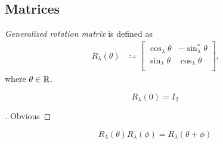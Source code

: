 \documentclass[../main.tex]{subfiles}
\begin{document}
\subsection{Matrices}
\begin{definition}\label{M:Rotation}
\textit{Generalized rotation matrix} is defined as
\begin{align*}
R_\lambda\left(\theta\right)&\coloneqq
\begin{bmatrix}
\cos_\lambda{\theta}&-\sin_\lambda^\ast{\theta}\\
\sin_\lambda{\theta}&\cos_\lambda{\theta}\\
\end{bmatrix}\text{,}
\end{align*}
where $\theta\in\mathbb{R}$.
\end{definition}
\begin{corollary}\label{M:Rotation:Identity}
\begin{equation*}
R_\lambda\left(0\right)
=
I_2
\end{equation*}
\end{corollary}
\begin{proof}[]
Obvious
\end{proof}
\begin{corollary}\label{M:Rotation:Sum}
\begin{equation*}
R_\lambda\left(\theta\right)R_\lambda\left(\phi\right)=R_\lambda\left(\theta+\phi\right)
\end{equation*}
\end{corollary}
\end{document}
